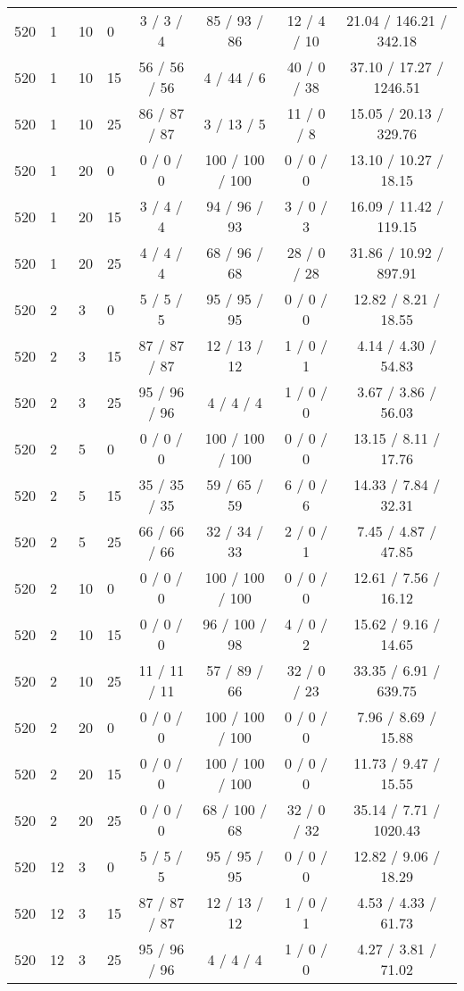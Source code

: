 \begin{table}[p]
\begin{tabular}{llllcccc}
520 & 1 & 10 & 0 & 3 / 3 / 4 & 85 / 93 / 86 & 12 / 4 / 10 & 21.04 / 146.21 / 342.18 \\
520 & 1 & 10 & 15 & 56 / 56 / 56 & 4 / 44 / 6 & 40 / 0 / 38 & 37.10 / 17.27 / 1246.51 \\
520 & 1 & 10 & 25 & 86 / 87 / 87 & 3 / 13 / 5 & 11 / 0 / 8 & 15.05 / 20.13 / 329.76 \\
520 & 1 & 20 & 0 & 0 / 0 / 0 & 100 / 100 / 100 & 0 / 0 / 0 & 13.10 / 10.27 / 18.15 \\
520 & 1 & 20 & 15 & 3 / 4 / 4 & 94 / 96 / 93 & 3 / 0 / 3 & 16.09 / 11.42 / 119.15 \\
520 & 1 & 20 & 25 & 4 / 4 / 4 & 68 / 96 / 68 & 28 / 0 / 28 & 31.86 / 10.92 / 897.91 \\
520 & 2 & 3 & 0 & 5 / 5 / 5 & 95 / 95 / 95 & 0 / 0 / 0 & 12.82 / 8.21 / 18.55 \\
520 & 2 & 3 & 15 & 87 / 87 / 87 & 12 / 13 / 12 & 1 / 0 / 1 & 4.14 / 4.30 / 54.83 \\
520 & 2 & 3 & 25 & 95 / 96 / 96 & 4 / 4 / 4 & 1 / 0 / 0 & 3.67 / 3.86 / 56.03 \\
520 & 2 & 5 & 0 & 0 / 0 / 0 & 100 / 100 / 100 & 0 / 0 / 0 & 13.15 / 8.11 / 17.76 \\
520 & 2 & 5 & 15 & 35 / 35 / 35 & 59 / 65 / 59 & 6 / 0 / 6 & 14.33 / 7.84 / 32.31 \\
520 & 2 & 5 & 25 & 66 / 66 / 66 & 32 / 34 / 33 & 2 / 0 / 1 & 7.45 / 4.87 / 47.85 \\
520 & 2 & 10 & 0 & 0 / 0 / 0 & 100 / 100 / 100 & 0 / 0 / 0 & 12.61 / 7.56 / 16.12 \\
520 & 2 & 10 & 15 & 0 / 0 / 0 & 96 / 100 / 98 & 4 / 0 / 2 & 15.62 / 9.16 / 14.65 \\
520 & 2 & 10 & 25 & 11 / 11 / 11 & 57 / 89 / 66 & 32 / 0 / 23 & 33.35 / 6.91 / 639.75 \\
520 & 2 & 20 & 0 & 0 / 0 / 0 & 100 / 100 / 100 & 0 / 0 / 0 & 7.96 / 8.69 / 15.88 \\
520 & 2 & 20 & 15 & 0 / 0 / 0 & 100 / 100 / 100 & 0 / 0 / 0 & 11.73 / 9.47 / 15.55 \\
520 & 2 & 20 & 25 & 0 / 0 / 0 & 68 / 100 / 68 & 32 / 0 / 32 & 35.14 / 7.71 / 1020.43 \\
520 & 12 & 3 & 0 & 5 / 5 / 5 & 95 / 95 / 95 & 0 / 0 / 0 & 12.82 / 9.06 / 18.29 \\
520 & 12 & 3 & 15 & 87 / 87 / 87 & 12 / 13 / 12 & 1 / 0 / 1 & 4.53 / 4.33 / 61.73 \\
520 & 12 & 3 & 25 & 95 / 96 / 96 & 4 / 4 / 4 & 1 / 0 / 0 & 4.27 / 3.81 / 71.02 \\

\end{tabular}
\end{table}
